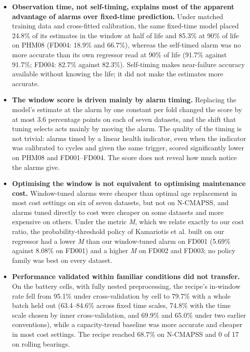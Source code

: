 \documentclass[a4paper,fleqn,doubleblind]{cas-dc}
\begin{document}
\begin{itemize}[leftmargin=1.2em,itemsep=2pt]
\item[(i)] \textbf{Observation time, not self-timing, explains most of the apparent advantage of alarms over fixed-time prediction.} Under matched training data and cross-fitted calibration, the same fixed-time model placed 24.8\% of its estimates in the window at half of life and 85.3\% at 90\% of life on PHM08 (FD004: 18.9\% and 66.7\%), whereas the self-timed alarm was no more accurate than its own regressor read at 90\% of life (91.7\% against 91.7\%; FD004: 82.7\% against 82.3\%). Self-timing makes near-failure accuracy available without knowing the life; it did not make the estimates more accurate.
\item[(ii)] \textbf{The window score is driven mainly by alarm timing.} Replacing the model's estimate at the alarm by one constant per fold changed the score by at most 3.6 percentage points on each of seven datasets, and the shift that tuning selects acts mainly by moving the alarm. The quality of the timing is not trivial: alarms timed by a linear health indicator, even when the indicator was calibrated to cycles and given the same trigger, scored significantly lower on PHM08 and FD001--FD004. The score does not reveal how much notice the alarms give.
\item[(iii)] \textbf{Optimising the window is not equivalent to optimising maintenance cost.} Window-tuned alarms were cheaper than optimal age replacement in most cost settings on six of seven datasets, but not on N-CMAPSS, and alarms tuned directly to cost were cheaper on some datasets and more expensive on others. Under the metric \textit{M}, which we relate exactly to our cost ratio, the probability-threshold policy of Kamariotis et al. \cite{kamariotis2024} built on our regressor had a lower \textit{M} than our window-tuned alarm on FD001 (5.69\% against 8.08\% on FD001) and a higher \textit{M} on FD002 and FD003; no policy family was best on every dataset.
\item[(iv)] \textbf{Performance validated within familiar conditions did not transfer.} On the battery cells, with fully nested preprocessing, the recipe's in-window rate fell from 95.1\% under cross-validation by cell to 79.7\% with a whole batch held out (63.4--84.6\% across fixed time scales, 74.8\% with the time scale chosen by inner cross-validation, and 69.9\% and 65.0\% under two earlier conventions), while a capacity-trend baseline was more accurate and cheaper in most cost settings. The recipe reached 68.7\% on N-CMAPSS and 0 of 17 on rolling bearings.
\end{itemize}
\end{document}

